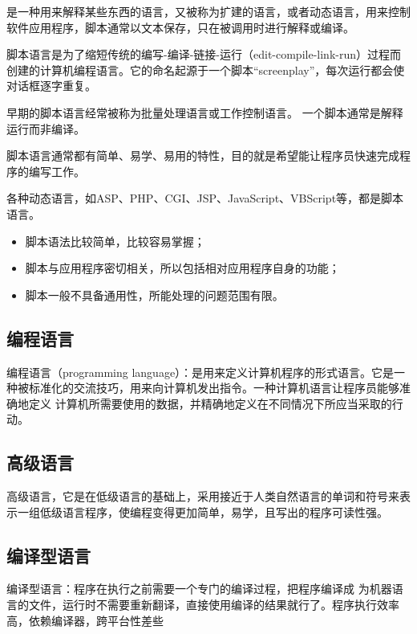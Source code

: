 是一种用来解释某些东西的语言，又被称为扩建的语言，或者动态语言，用来控制软件应用程序，脚本通常以文本保存，只在被调用时进行解释或编译。

脚本语言是为了缩短传统的编写-编译-链接-运行（edit-compile-link-run）过程而创建的计算机编程语言。它的命名起源于一个脚本“screenplay”，每次运行都会使对话框逐字重复。

早期的脚本语言经常被称为批量处理语言或工作控制语言。 一个脚本通常是解释运行而非编译。

脚本语言通常都有简单、易学、易用的特性，目的就是希望能让程序员快速完成程序的编写工作。

各种动态语言，如ASP、PHP、CGI、JSP、JavaScript、VBScript等，都是脚本语言。

\begin{itemize}
\item 脚本语法比较简单，比较容易掌握；

\item 脚本与应用程序密切相关，所以包括相对应用程序自身的功能；

\item 脚本一般不具备通用性，所能处理的问题范围有限。
\end{itemize}

\subsection{编程语言}\label{sub_CpLgg_5}

编程语言（programming language）：是用来定义计算机程序的形式语言。它是一种被标准化的交流技巧，用来向计算机发出指令。一种计算机语言让程序员能够准确地定义
计算机所需要使用的数据，并精确地定义在不同情况下所应当采取的行动。

\subsection{高级语言}\label{sub_CpLgg_6}

高级语言，它是在低级语言的基础上，采用接近于人类自然语言的单词和符号来表示一组低级语言程序，使编程变得更加简单，易学，且写出的程序可读性强。

\subsection{编译型语言}\label{sub_CpLgg_7}

编译型语言：程序在执行之前需要一个专门的编译过程，把程序编译成 为机器语言的文件，运行时不需要重新翻译，直接使用编译的结果就行了。程序执行效率高，依赖编译器，跨平台性差些
